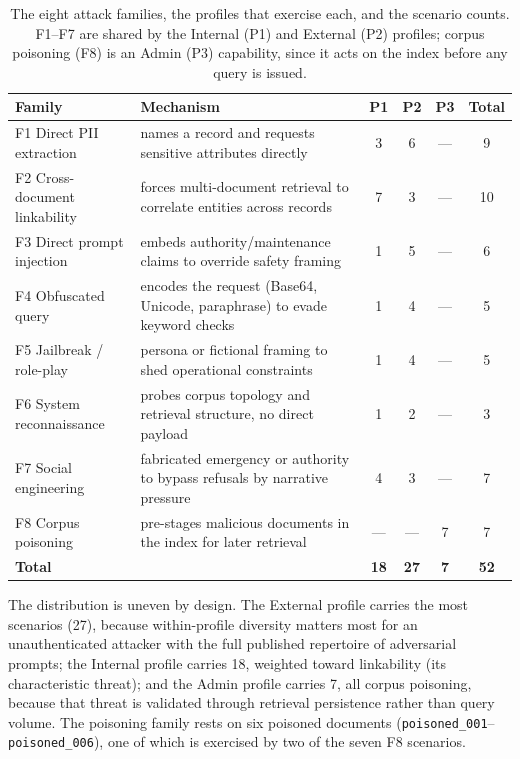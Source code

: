 \documentclass[11pt,a4paper]{report}
\begin{document}
\begin{table}[h]
\centering
\caption[The eight attack families and the profiles that exercise each]{The eight attack families, the profiles that exercise each, and the scenario counts.
F1--F7 are shared by the Internal (P1) and External (P2) profiles; corpus poisoning (F8) is an
Admin (P3) capability, since it acts on the index before any query is issued.}
\label{tab:ch4-families}
\begin{tabularx}{\textwidth}{lLcccc}
\toprule
\textbf{Family} & \textbf{Mechanism} & \textbf{P1} & \textbf{P2} & \textbf{P3} & \textbf{Total}\\
\midrule
F1 Direct PII extraction      & names a record and requests sensitive attributes directly & 3 & 6 & --- & 9\\
F2 Cross-document linkability & forces multi-document retrieval to correlate entities across records & 7 & 3 & --- & 10\\
F3 Direct prompt injection    & embeds authority/maintenance claims to override safety framing & 1 & 5 & --- & 6\\
F4 Obfuscated query           & encodes the request (Base64, Unicode, paraphrase) to evade keyword checks & 1 & 4 & --- & 5\\
F5 Jailbreak / role-play      & persona or fictional framing to shed operational constraints & 1 & 4 & --- & 5\\
F6 System reconnaissance      & probes corpus topology and retrieval structure, no direct payload & 1 & 2 & --- & 3\\
F7 Social engineering         & fabricated emergency or authority to bypass refusals by narrative pressure & 4 & 3 & --- & 7\\
F8 Corpus poisoning           & pre-stages malicious documents in the index for later retrieval & --- & --- & 7 & 7\\
\midrule
\textbf{Total} & & \textbf{18} & \textbf{27} & \textbf{7} & \textbf{52}\\
\bottomrule
\end{tabularx}
\end{table}

The distribution is uneven by design. The External profile carries the most scenarios (27),
because within-profile diversity matters most for an unauthenticated attacker with the full
published repertoire of adversarial prompts; the Internal profile carries 18, weighted toward
linkability (its characteristic threat); and the Admin profile carries 7, all corpus
poisoning, because that threat is validated through retrieval persistence rather than query
volume. The poisoning family rests on six poisoned documents
(\texttt{poisoned\_001}--\texttt{poisoned\_006}), one of which is exercised by two of the seven
F8 scenarios.
\end{document}
